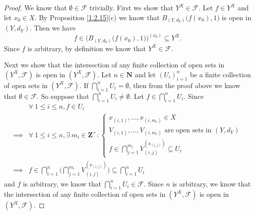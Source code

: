 \begin{proof}
    We know that \(\emptyset \in \mathcal{F}\) trivially.
    First we show that \(Y^X \in \mathcal{F}\).
    Let \(f \in Y^X\) and let \(x_0 \in X\).
    By Proposition \ref{1.2.15}(c) we know that \(B_{(Y, d_Y)}\big(f(x_0), 1\big)\) is open in \((Y, d_Y)\).
    Then we have
    \[
        f \in \Big(B_{(Y, d_Y)}\big(f(x_0), 1\big)\Big)^{(x_0)} \subseteq Y^X.
    \]
    Since \(f\) is arbitrary, by definition we know that \(Y^X \in \mathcal{F}\).

    Next we show that the intersection of any finite collection of open sets in \((Y^X, \mathcal{F})\) is open in \((Y^X, \mathcal{F})\).
    Let \(n \in \mathbf{N}\) and let \((U_i)_{i = 1}^n\) be a finite collection of open sets in \((Y^X, \mathcal{F})\).
    If \(\bigcap_{i = 1}^n U_i = \emptyset\), then from the proof above we know that \(\emptyset \in \mathcal{F}\).
    So suppose that \(\bigcap_{i = 1}^n U_i \neq \emptyset\).
    Let \(f \in \bigcap_{i = 1}^n U_i\).
    Since
    \begin{align*}
                 & \forall\ 1 \leq i \leq n, f \in U_i                                                                                 \\
        \implies & \forall\ 1 \leq i \leq n, \exists\ m_i \in \mathbf{Z}^+ : \begin{cases}
            x_{(i, 1)}, \dots, x_{(i, m_i)} \in X                              \\
            V_{(i, 1)}, \dots, V_{(i, m_i)} \text{ are open sets in } (Y, d_Y) \\
            f \in \bigcap_{j = 1}^{m_i} V_{(i, j)}^{(x_{(i, j)})} \subseteq U_i
        \end{cases}                                \\
        \implies & f \in \bigcap_{i = 1}^n \bigg(\bigcap_{j = 1}^{m_i} V_{(i, j)}^{(x_{(i, j)})}\bigg) \subseteq \bigcap_{i = 1}^n U_i
    \end{align*}
    and \(f\) is arbitrary, we know that \(\bigcap_{i = 1}^n U_i \in \mathcal{F}\).
    Since \(n\) is arbitrary, we know that the intersection of any finite collection of open sets in \((Y^X, \mathcal{F})\) is open in \((Y^X, \mathcal{F})\).


\end{proof}
